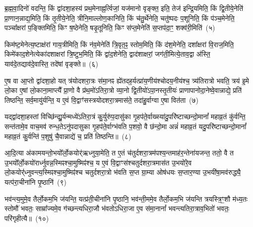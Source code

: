 {\anuvakamend[{व्याह॒ स दृ॑शी॒कवो᳚\-ऽर्चि॒तारः॒ स एक॑ञ्च}]}%

ब्र॒ह्म॒वा॒दिनो॑ वदन्ति॒ किं द्वा॑दशा॒हस्य॑ प्रथ॒मेनाह्न॒र्त्विजां॒ यज॑मानो वृङ्क्त॒ इति॒ तेज॑ इन्द्रि॒यमिति॒ किं द्वि॒तीये॒नेति॑ प्रा॒णान॒न्नाद्य॒मिति॒ किं तृ॒तीये॒नेति॒ त्रीनि॒माल्लोण॒कानिति॒ किं च॑तु॒र्थेनेति॒ चतु॑ष्पदः प॒शूनिति॒ किं प॑ञ्च॒मेनेति॒ पञ्चा᳚क्षरां प॒ङ्क्तिमिति॒ किꣳ ष॒ष्ठेनेति॒ षडृ॒तूनिति॒ किꣳ स॑प्त॒मेनेति॑ स॒प्तप॑दा॒ꣳ॒ शक्व॑री॒मिति॑~(५)

किम॑ष्ट॒मेनेत्य॒ष्टाक्ष॑रां गाय॒त्रीमिति॒ किं न॑व॒मेनेति॑ त्रि॒वृत॒ꣴ॒ स्तोम॒मिति॒ किं द॑श॒मेनेति॒ दशा᳚क्षरां वि॒राज॒मिति॒ किमे॑काद॒शेनेत्येका॑\-दशाक्षरां त्रि॒ष्टुभ॒मिति॒ किं द्वा॑द॒शेनेति॒ द्वाद॑शाक्षरां॒ जग॑ती॒मित्ये॒ताव॒द्वा अ॑स्ति॒ याव॑दे॒तद्याव॑दे॒वास्ति॒ तदे॑षां वृङ्क्ते॥~(६)

{\anuvakamend[{शक्व॑री॒मित्येक॑चत्वारिꣳशच्च}]}%

ए॒ष वा आ॒प्तो द्वा॑दशा॒हो यत् त्र॑योदशरा॒त्रः स॑मा॒नꣴ ह्ये॑तदह॒र्यत्प्रा॑य॒णीय॑श्चोदय॒नीय॑श्च॒ त्र्य॑तिरात्रो भवति॒ त्रय॑ इ॒मे लो॒का ए॒षां लो॒काना॒माप्त्यै᳚ प्रा॒णो वै प्र॑थ॒मो॑\-ऽतिरा॒त्रो व्या॒नो द्वि॒तीयो॑\-ऽपा॒नस्तृ॒तीयः॑ प्राणापानोदा॒नेष्वे॒वान्नाद्ये॒ प्रति॑ तिष्ठन्ति॒ सर्व॒मायु॑र्यन्ति॒ य ए॒वं वि॒द्वाꣳ॑सस्त्रयोदशरा॒त्रमास॑ते॒ तदा॑हु॒र्वाग्वा ए॒षा वित॑ता~(७)

यद्द्वा॑दशा॒हस्तां विच्छि॑न्द्यु॒र्यन्मध्ये॑\-ऽतिरा॒त्रं कु॒र्युरु॑प॒दासु॑का गृ॒हप॑ते॒र्वाख्स्या॑दु॒परि॑ष्टाच्छन्दो॒मानां᳚ महाव्र॒तं कु॑र्वन्ति॒ सन्त॑तामे॒व वाच॒मव॑ रुन्ध॒ते\-ऽनु॑पदासुका गृ॒हप॑ते॒र्वाग्भ॑वति प॒शवो॒ वै छ॑न्दो॒मा अन्नं॑ महाव्र॒तं यदु॒परि॑ष्टाच्छन्दो॒मानां᳚ महाव्र॒तं कु॒र्वन्ति॑ प॒शुषु॑ चै॒वान्नाद्ये॑ च॒ प्रति॑ तिष्ठन्ति॥~(८)

{\anuvakamend[{वित॑ता॒ त्रिच॑त्वारिꣳशच्च}]}%

आ॒दि॒त्या अ॑कामयन्तो॒भयो᳚र्लो॒कयोर्॑ऋध्नुया॒मेति॒ त ए॒तं च॑तुर्दशरा॒त्रम॑पश्य॒न्तमाह॑र॒न्तेना॑यजन्त॒ ततो॒ वै त उ॒भयो᳚र्लो॒कयो॑रार्ध्नुवन्न॒स्मिꣴश्चा॒मुष्मिꣴ॑श्च॒ य ए॒वं वि॒द्वाꣳस॑श्चतुर्दशरा॒त्रमास॑त उ॒भयो॑रे॒व लो॒कयोर्॑\mbox{}॑ध्नुवन्त्य॒\-स्मिꣴश्चा॒मुष्मिꣴ॑श्च चतुर्दशरा॒त्रो भ॑वति स॒प्त ग्रा॒म्या ओष॑धयः स॒प्तार॒ण्या उ॒भयी॑षा॒मव॑रुद्ध्यै॒ यत्प॑रा॒चीना॑नि पृ॒ष्ठानि॑~(९)

भव॑न्त्य॒मुमे॒व तैर्लो॒कम॒भि ज॑यन्ति॒ यत्प्र॑ती॒चीना॑नि पृ॒ष्ठानि॒ भव॑न्ती॒ममे॒व तैर्लो॒कम॒भि ज॑यन्ति त्रयस्त्रि॒ꣳ॒शौ म॑ध्य॒तः स्तोमौ॑ भवतः॒ साम्रा᳚ज्यमे॒व ग॑च्छन्त्यधिरा॒जौ भ॑वतो\-ऽधिरा॒जा ए॒व स॑मा॒नानां᳚ भवन्त्यतिरा॒त्राव॒भितो॑ भवतः॒ परि॑गृहीत्यै॥~(१०)

{\anuvakamend[{पृ॒ष्ठानि॒ चतु॑स्त्रिꣳशच्च}]}%

